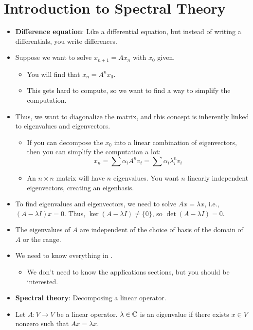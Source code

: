 \documentclass[../../notes.tex]{subfiles}
\begin{document}
\chapter{Introduction to Spectral Theory}
\begin{itemize}
    \item {}\textbf{Difference equation}: Like a differential equation, but instead of writing a differentials, you write differences.
    \item Suppose we want to solve $x_{n+1}=Ax_n$ with $x_0$ given.
    \begin{itemize}
        \item You will find that $x_n=A^nx_0$.
        \item This gets hard to compute, so we want to find a way to simplify the computation.
    \end{itemize}
    \item Thus, we want to diagonalize the matrix, and this concept is inherently linked to eigenvalues and eigenvectors.
    \begin{itemize}
        \item If you can decompose the $x_0$ into a linear combination of eigenvectors, then you can simplify the computation a lot:
        \begin{equation*}
            x_n = \sum\alpha_iA^nv_i = \sum\alpha_i\lambda_i^nv_i
        \end{equation*}
        \item An $n\times n$ matrix will have $n$ eigenvalues. You want $n$ linearly independent eigenvectors, creating an eigenbasis.
    \end{itemize}
    \item To find eigenvalues and eigenvectors, we need to solve $Ax=\lambda x$, i.e., $(A-\lambda I)x=0$. Thus, $\ker(A-\lambda I)\neq\{0\}$, so $\det(A-\lambda I)=0$.
    \item The eigenvalues of $A$ are independent of the choice of basis of the domain of $A$ or the range.
    \item {}We need to know everything in \textcite{bib:Treil}.
    \begin{itemize}
        \item We don't need to know the applications sections, but you should be interested.
    \end{itemize}
    \item \textbf{Spectral theory}: Decomposing a linear operator.
    \item Let $A:V\to V$ be a linear operator. $\lambda\in\mathbb{C}$ is an eigenvalue if there exists $x\in V$ nonzero such that $Ax=\lambda x$.

\end{itemize}
\end{document}
